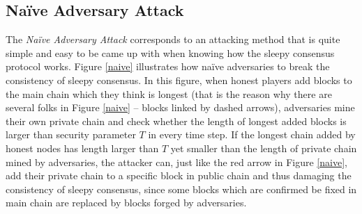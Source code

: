 \documentclass{llncs}
\begin{document}
\subsection{Na{\"i}ve Adversary Attack}
\quad The \emph{Na{\"i}ve Adversary Attack} corresponds to an attacking method that is quite simple and easy to be came up with when knowing how the sleepy consensus protocol works. Figure \ref{naive} illustrates how na{\"i}ve adversaries to break the consistency of sleepy consensus. In this figure, when honest players add blocks to the main chain which they think is longest (that is the reason why there are several folks in Figure \ref{naive} -- blocks linked by dashed arrows), adversaries mine their own private chain and check whether the length of longest added blocks is larger than security parameter $T$ in every time step. If the longest chain added by honest nodes has length larger than $T$ yet smaller than the length of private chain mined by adversaries, the attacker can, just like the red arrow in Figure \ref{naive}, add their private chain to a specific block in public chain and thus damaging the consistency of sleepy consensus, since some blocks which are confirmed be fixed in main chain are replaced by blocks forged by adversaries.
\vspace{-4mm}
\end{document}
